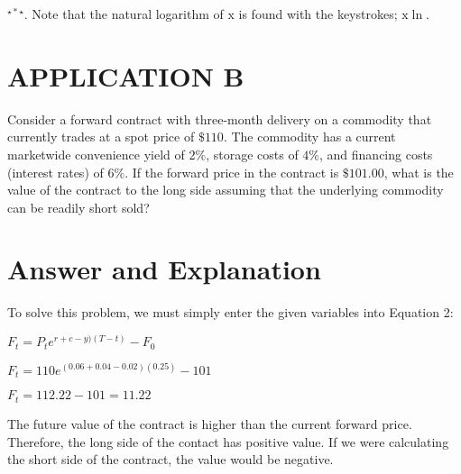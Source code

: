 \documentclass[11pt]{article}
\begin{document}
${ }^{\star * \star}$. Note that the natural logarithm of $\mathrm{x}$ is found with the keystrokes; $\mathrm{x} \ln$.

\section*{APPLICATION B}
Consider a forward contract with three-month delivery on a commodity that currently trades at a spot price of $\$ 110$. The commodity has a current marketwide convenience yield of $2 \%$, storage costs of $4 \%$, and financing costs (interest rates) of $6 \%$. If the forward price in the contract is $\$ 101.00$, what is the value of the contract to the long side assuming that the underlying commodity can be readily short sold?

\section*{Answer and Explanation}
To solve this problem, we must simply enter the given variables into Equation 2:

$F_{t}=P_{t} e^{r+c-y)(T-t)}-F_{0}$

$F_{t}=110 e^{(0.06+0.04-0.02)(0.25)}-101$

$F_{t}=112.22-101=11.22$

The future value of the contract is higher than the current forward price. Therefore, the long side of the contact has positive value. If we were calculating the short side of the contract, the value would be negative.
\end{document}
